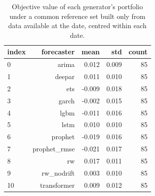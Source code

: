 \begin{table}
\caption{Objective value of each generator's portfolio under a common reference set built only from data available at the date, centred within each date.}
\label{tab:objective_gap}
\begin{tabular}{lrrrr}
\toprule
index & forecaster & mean & std & count \\
\midrule
0 & arima & 0.012 & 0.009 & 85 \\
1 & deepar & 0.011 & 0.010 & 85 \\
2 & ets & -0.009 & 0.018 & 85 \\
3 & garch & -0.002 & 0.015 & 85 \\
4 & lgbm & -0.011 & 0.016 & 85 \\
5 & lstm & 0.010 & 0.010 & 85 \\
6 & prophet & -0.019 & 0.016 & 85 \\
7 & prophet\_rmse & -0.021 & 0.017 & 85 \\
8 & rw & 0.017 & 0.011 & 85 \\
9 & rw\_nodrift & 0.003 & 0.010 & 85 \\
10 & transformer & 0.009 & 0.012 & 85 \\
\bottomrule
\end{tabular}
\end{table}
